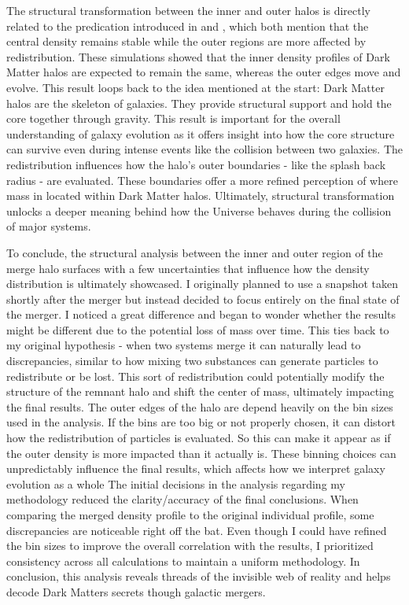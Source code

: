 \documentclass[fleqn,usenatbib]{mnras}
\begin{document}
The structural transformation between the inner and outer halos is directly related to the predication introduced in \citep{2019MNRAS.487..993D} and \citep{10.1111/j.1365-2966.2010.16912.x}, which both mention that the central density remains stable while the outer regions are more affected by redistribution. These simulations showed that the inner density profiles of Dark Matter halos are expected to remain the same, whereas the outer edges move and evolve. This result loops back to the idea mentioned at the start: Dark Matter halos are the skeleton of galaxies. They provide structural support and hold the core together through gravity. This result is important for the overall understanding of galaxy evolution as it offers insight into how the core structure can survive even during intense events like the collision between two galaxies. The redistribution influences how the halo's outer boundaries - like the splash back radius - are evaluated. These boundaries offer a more refined perception of where mass in located within Dark Matter halos. Ultimately, structural transformation unlocks a deeper meaning behind how the Universe behaves during the collision of major systems. 

To conclude, the structural analysis between the inner and outer region of the merge halo surfaces with a few uncertainties that influence how the density distribution is ultimately showcased. I originally planned to use a snapshot taken shortly after the merger but instead decided to focus entirely on the final state of the merger. I noticed a great difference and began to wonder whether the results might be different due to the potential loss of mass over time. This ties back to my original hypothesis - when two systems merge it can naturally lead to discrepancies, similar to how mixing two substances can generate particles to redistribute or be lost. This sort of redistribution could potentially modify the structure of the remnant halo and shift the center of mass, ultimately impacting the final results. The outer edges of the halo are depend heavily on the bin sizes used in the analysis. If the bins are too big or not properly chosen, it can distort how the redistribution of particles is evaluated. So this can make it appear as if the outer density is more impacted than it actually is. These binning choices can unpredictably influence the final results, which affects how we interpret galaxy evolution as a whole The initial decisions in the analysis regarding my methodology reduced the clarity/accuracy of the final conclusions. When comparing the merged density profile to the original individual profile, some discrepancies are noticeable right off the bat. Even though I could have refined the bin sizes to improve the overall correlation with the results, I prioritized consistency across all calculations to maintain a uniform methodology. In conclusion, this analysis reveals threads of the invisible web of reality and helps decode Dark Matters secrets though galactic mergers. 

\begingroup 

\nocite{*} 




\endgroup

\bsp	%
\label{lastpage}
\end{document}

